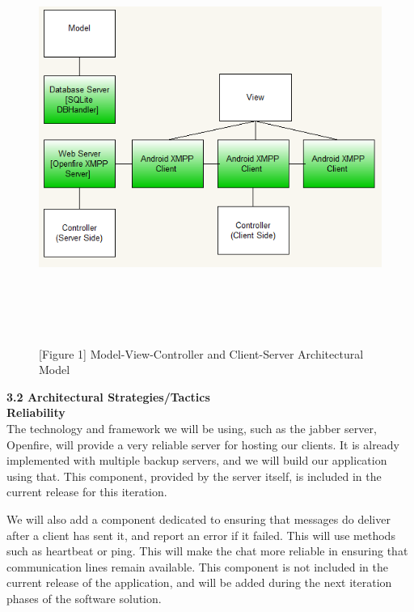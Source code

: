 \documentclass[29pt,a4paper]{moderncv}
\begin{document}
				\noindent\begin{figure}
				\centering
				\includegraphics[width=6.0in, height=5.0in]{./OverallArchitecture.png}
				\\\caption{[Figure 1] Model-View-Controller and Client-Server Architectural Model}
				\end{figure}
		\vspace{5mm}
\newpage		
		\noindent \textbf{3.2 Architectural Strategies/Tactics} \\
			\textbf{Reliability} 
				\\The technology and framework we will be using, such as the jabber server, Openfire, will provide a very reliable server for hosting our clients. It is already implemented with multiple backup servers, and we will build our application using that. This component, provided by the server itself, is included in the current release for this iteration.
				
				We will also add a component dedicated to ensuring that messages do deliver after a client has sent it, and report an error if it failed. This will use methods such as heartbeat or ping. This will make the chat more reliable in ensuring that communication lines remain available. This component is not included in the current release of the application, and will be added during the next iteration phases of the software solution. 
				
\end{document}

